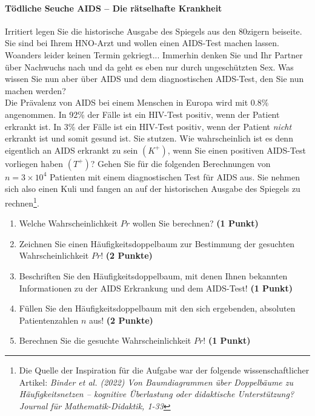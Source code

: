 \documentclass[a4paper, 9pt]{scrartcl}\usepackage[]{graphicx}\usepackage[]{xcolor}
\begin{document}
\paragraph{T{\"o}dliche Seuche AIDS -- Die r{\"a}tselhafte Krankheit}




Irritiert legen Sie die historische Ausgabe des Spiegels aus den 80zigern
beiseite. Sie sind bei Ihrem HNO-Arzt und wollen einen AIDS-Test machen
lassen. Woanders leider keinen Termin gekriegt... Immerhin denken Sie und
Ihr Partner {\"u}ber Nachwuchs nach und da geht es eben nur durch
ungesch{\"u}tzten Sex. Was wissen Sie nun aber {\"u}ber AIDS und dem diagnostischen
AIDS-Test, den Sie nun machen werden?\\

Die Pr{\"a}valenz von AIDS bei einem Menschen in Europa wird mit
0.8\% angenommen. In 92\% der F{\"a}lle ist ein
HIV-Test positiv, wenn der Patient erkrankt ist. In 3\%
der F{\"a}lle ist ein HIV-Test positiv, wenn der Patient \textit{nicht}
erkrankt ist und somit gesund ist. Sie stutzen. Wie wahrscheinlich ist es
denn eigentlich an AIDS erkrankt zu sein $(K^+)$, wenn Sie einen positiven
AIDS-Test vorliegen haben $(T^+)$? Gehen Sie f{\"u}r die folgenden Berechnungen
von $n = \ensuremath{3\times 10^{4}}$ Patienten mit einem diagnostischen Test f{\"u}r AIDS
aus. Sie nehmen sich also einen Kuli und fangen an auf der historischen
Ausgabe des Spiegels zu rechnen\footnote{Die Quelle der Inspiration f{\"u}r die
  Aufgabe war der folgende wissenschaftlicher Artikel: \textit{Binder et
    al. (2022) Von Baumdiagrammen {\"u}ber Doppelb{\"a}ume zu H{\"a}ufigkeitsnetzen --
    kognitive {\"U}berlastung oder didaktische Unterst{\"u}tzung? Journal f{\"u}r
    Mathematik-Didaktik, 1-33}}.

\begin{enumerate}
\item Welche Wahrscheinlichkeit $Pr$ wollen Sie berechnen? \textbf{(1 Punkt)}
\item Zeichnen Sie einen H{\"a}ufigkeitsdoppelbaum zur Bestimmung der gesuchten
  Wahrscheinlichkeit $Pr$! \textbf{(2 Punkte)} 
\item Beschriften Sie den H{\"a}ufigkeitsdoppelbaum, mit denen Ihnen bekannten
  Informationen zu der AIDS Erkrankung und dem AIDS-Test! \textbf{(1 Punkt)}
\item F{\"u}llen Sie den H{\"a}ufigkeitsdoppelbaum mit den sich ergebenden,
  absoluten Patientenzahlen $n$ aus! \textbf{(2 Punkte)}
\item Berechnen Sie die gesuchte Wahrscheinlichkeit $Pr$! \textbf{(1 Punkt)}
\end{enumerate}
\end{document}
